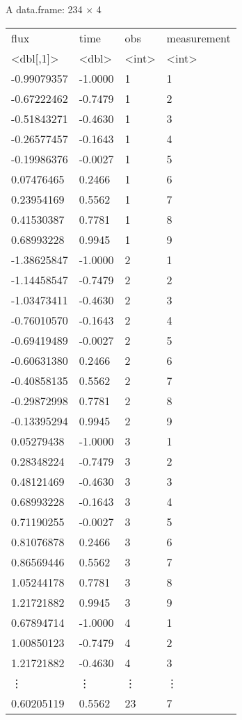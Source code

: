 \documentclass[11pt]{article}
\begin{document}
    A data.frame: 234 × 4
\begin{tabular}{llll}
 flux & time & obs & measurement\\
 <dbl{[},1{]}> & <dbl> & <int> & <int>\\
\hline
	 -0.99079357 & -1.0000 & 1 & 1\\
	 -0.67222462 & -0.7479 & 1 & 2\\
	 -0.51843271 & -0.4630 & 1 & 3\\
	 -0.26577457 & -0.1643 & 1 & 4\\
	 -0.19986376 & -0.0027 & 1 & 5\\
	  0.07476465 &  0.2466 & 1 & 6\\
	  0.23954169 &  0.5562 & 1 & 7\\
	  0.41530387 &  0.7781 & 1 & 8\\
	  0.68993228 &  0.9945 & 1 & 9\\
	 -1.38625847 & -1.0000 & 2 & 1\\
	 -1.14458547 & -0.7479 & 2 & 2\\
	 -1.03473411 & -0.4630 & 2 & 3\\
	 -0.76010570 & -0.1643 & 2 & 4\\
	 -0.69419489 & -0.0027 & 2 & 5\\
	 -0.60631380 &  0.2466 & 2 & 6\\
	 -0.40858135 &  0.5562 & 2 & 7\\
	 -0.29872998 &  0.7781 & 2 & 8\\
	 -0.13395294 &  0.9945 & 2 & 9\\
	  0.05279438 & -1.0000 & 3 & 1\\
	  0.28348224 & -0.7479 & 3 & 2\\
	  0.48121469 & -0.4630 & 3 & 3\\
	  0.68993228 & -0.1643 & 3 & 4\\
	  0.71190255 & -0.0027 & 3 & 5\\
	  0.81076878 &  0.2466 & 3 & 6\\
	  0.86569446 &  0.5562 & 3 & 7\\
	  1.05244178 &  0.7781 & 3 & 8\\
	  1.21721882 &  0.9945 & 3 & 9\\
	  0.67894714 & -1.0000 & 4 & 1\\
	  1.00850123 & -0.7479 & 4 & 2\\
	  1.21721882 & -0.4630 & 4 & 3\\
	 ⋮ & ⋮ & ⋮ & ⋮\\
	  0.60205119 &  0.5562 & 23 & 7\\

\end{tabular}
\end{document}
